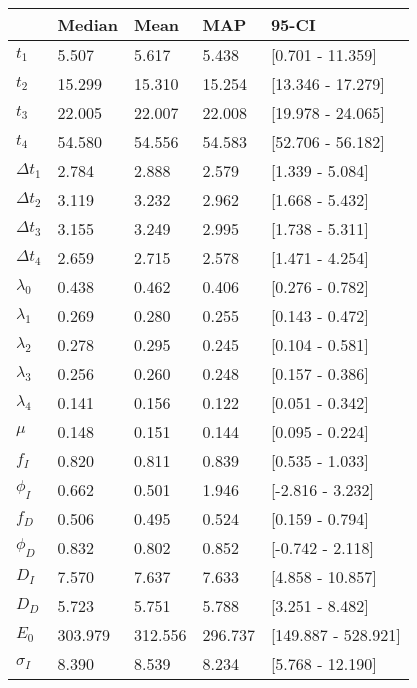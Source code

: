 \begin{tabular}{lllll}
\toprule
{} &   Median &     Mean &      MAP &                95-CI \\
\midrule
$t_1$        &    5.507 &    5.617 &    5.438 &     [0.701 - 11.359] \\
$t_2$        &   15.299 &   15.310 &   15.254 &    [13.346 - 17.279] \\
$t_3$        &   22.005 &   22.007 &   22.008 &    [19.978 - 24.065] \\
$t_4$        &   54.580 &   54.556 &   54.583 &    [52.706 - 56.182] \\
$\Delta t_1$ &    2.784 &    2.888 &    2.579 &      [1.339 - 5.084] \\
$\Delta t_2$ &    3.119 &    3.232 &    2.962 &      [1.668 - 5.432] \\
$\Delta t_3$ &    3.155 &    3.249 &    2.995 &      [1.738 - 5.311] \\
$\Delta t_4$ &    2.659 &    2.715 &    2.578 &      [1.471 - 4.254] \\
$\lambda_0$  &    0.438 &    0.462 &    0.406 &      [0.276 - 0.782] \\
$\lambda_1$  &    0.269 &    0.280 &    0.255 &      [0.143 - 0.472] \\
$\lambda_2$  &    0.278 &    0.295 &    0.245 &      [0.104 - 0.581] \\
$\lambda_3$  &    0.256 &    0.260 &    0.248 &      [0.157 - 0.386] \\
$\lambda_4$  &    0.141 &    0.156 &    0.122 &      [0.051 - 0.342] \\
$\mu$        &    0.148 &    0.151 &    0.144 &      [0.095 - 0.224] \\
$f_I$        &    0.820 &    0.811 &    0.839 &      [0.535 - 1.033] \\
$\phi_I$     &    0.662 &    0.501 &    1.946 &     [-2.816 - 3.232] \\
$f_D$        &    0.506 &    0.495 &    0.524 &      [0.159 - 0.794] \\
$\phi_D$     &    0.832 &    0.802 &    0.852 &     [-0.742 - 2.118] \\
$D_I$        &    7.570 &    7.637 &    7.633 &     [4.858 - 10.857] \\
$D_D$        &    5.723 &    5.751 &    5.788 &      [3.251 - 8.482] \\
$E_0$        &  303.979 &  312.556 &  296.737 &  [149.887 - 528.921] \\
$\sigma_I$   &    8.390 &    8.539 &    8.234 &     [5.768 - 12.190] \\

\end{tabular}

